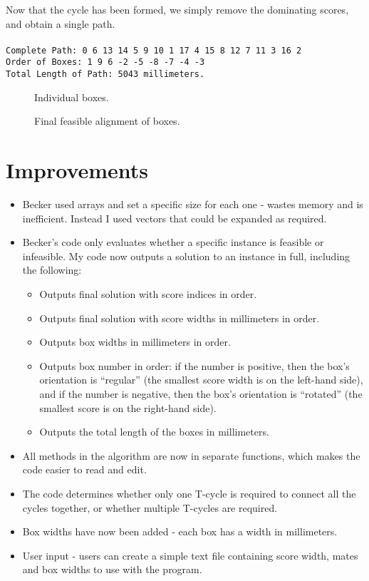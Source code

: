 \documentclass[a4paper, 11pt, twoside, onecolumn, openany]{article}
\newcommand{\code}[1]{\colorbox{light-gray}{\texttt{#1}}}
\begin{document}
Now that the cycle has been formed, we simply remove the dominating scores, and obtain a single path.\\
\\
\code{Complete Path: 0 6 13 14 5 9 10 1 17 4 15 8 12 7 11 3 16 2}\\
\code{Order of Boxes: 1 9 6 -2 -5 -8 -7 -4 -3}\\
\code{Total Length of Path: 5043 millimeters.}


\begin{figure}[htb]	
	\centering
	
	\caption{Individual boxes.}	
	\label{fig:boxes}
\end{figure}



\begin{figure}[htb]
	\centering
	
	\caption{Final feasible alignment of boxes.}	
	\label{fig:path}
\end{figure}


\section{Improvements}
\begin{itemize}
	\item Becker used arrays and set a specific size for each one - wastes memory and is inefficient. Instead I used vectors that could be expanded as required.
	\item Becker's code only evaluates whether a specific instance is feasible or infeasible. My code now outputs a solution to an instance in full, including the following:
	\begin{itemize}
		\item Outputs final solution with score indices in order.
		\item Outputs final solution with score widths in millimeters in order.
		\item Outputs box widths in millimeters in order.
		\item Outputs box number in order: if the number is positive, then the box's orientation is ``regular'' (the smallest score width is on the left-hand side), and if the number is negative, then the box's orientation is ``rotated'' (the smallest score is on the right-hand side).
		\item Outputs the total length of the boxes in millimeters.
	\end{itemize}
	\item All methods in the algorithm are now in separate functions, which makes the code easier to read and edit.
	\item The code determines whether only one T-cycle is required to connect all the cycles together, or whether multiple T-cycles are required. 
	\item Box widths have now been added - each box has a width in millimeters.
	\item User input - users can create a simple text file containing score width, mates and box widths to use with the program.
	
	
	
\end{itemize}
\end{document}
